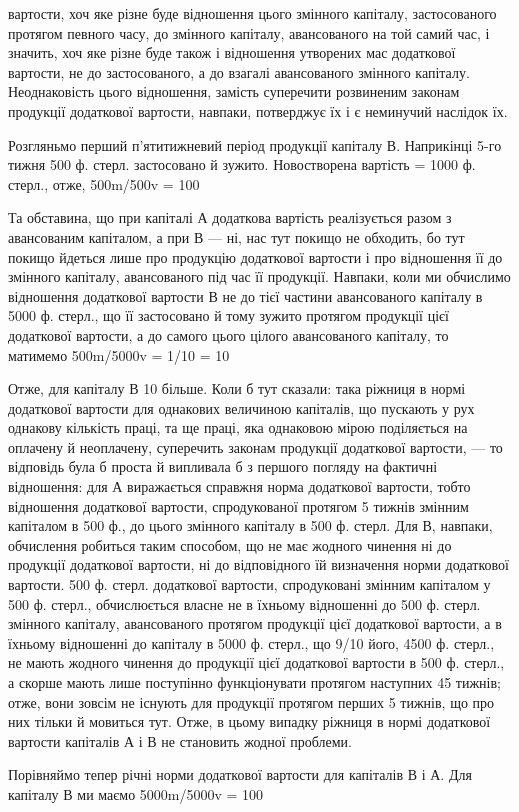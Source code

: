 вартости, хоч яке різне буде відношення цього змінного капіталу, застосованого
протягом певного часу, до змінного капіталу, авансованого на
той самий час, і значить, хоч яке різне буде також і відношення утворених
мас додаткової вартости, не до застосованого, а до взагалі авансованого
змінного капіталу. Неоднаковість цього відношення, замість суперечити
розвиненим законам продукції додаткової вартости, навпаки,
потверджує їх і є неминучий наслідок їх.

Розгляньмо перший п’ятитижневий період продукції капіталу В. Наприкінці
5-го тижня 500 ф. стерл. застосовано й зужито. Новостворена
вартість = 1000 ф. стерл., отже, 500m/500v = 100%

Та обставина, що при капіталі А додаткова вартість реалізується разом з
авансованим капіталом, а при В — ні, нас тут покищо не обходить, бо
тут покищо йдеться лише про продукцію додаткової вартости і про
відношення її до змінного капіталу, авансованого під час її продукції.
Навпаки, коли ми обчислимо відношення додаткової вартости В не
до тієї частини авансованого капіталу в 5000 ф. стерл., що її застосовано й
тому зужито протягом продукції цієї додаткової вартости, а до самого
цього цілого авансованого капіталу, то матимемо 500m/5000v = 1/10 = 10%

Отже, для капіталу В 10%
більше. Коли б тут сказали: така ріжниця в нормі додаткової вартости
для однакових величиною капіталів, що пускають у рух однакову кількість
праці, та ще праці, яка однаковою мірою поділяється на оплачену й
неоплачену, суперечить законам продукції додаткової вартости, — то
відповідь була б проста й випливала б з першого погляду на фактичні
відношення: для А виражається справжня норма додаткової вартости,
тобто відношення додаткової вартости, спродукованої протягом 5 тижнів
змінним капіталом в 500 ф., до цього змінного капіталу в 500 ф. стерл.
Для В, навпаки, обчислення робиться таким способом, що не має жодного
чинення ні до продукції додаткової вартости, ні до відповідного їй
визначення норми додаткової вартости. 500 ф. стерл. додаткової вартости,
спродуковані змінним капіталом у 500 ф. стерл., обчислюється
власне не в їхньому відношенні до 500 ф. стерл. змінного капіталу, авансованого
протягом продукції цієї додаткової вартости, а в їхньому відношенні
до капіталу в 5000 ф. стерл., що 9/10 його, 4500 ф. стерл., не мають
жодного чинення до продукції цієї додаткової вартости в 500 ф. стерл., а
скорше мають лише поступінно функціонувати протягом наступних 45 тижнів;
отже, вони зовсім не існують для продукції протягом перших 5 тижнів,
що про них тільки й мовиться тут. Отже, в цьому випадку ріжниця
в нормі додаткової вартости капіталів А і В не становить жодної
проблеми.

Порівняймо тепер річні норми додаткової вартости для капіталів В і А.
Для капіталу В ми маємо 5000m/5000v = 100%
